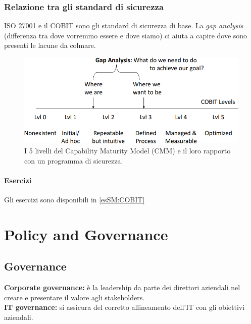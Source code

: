 \subsection{Relazione tra gli standard di sicurezza}

ISO 27001 e il COBIT sono gli standard di sicurezza di base. La \textit{gap
analysis} (differenza tra dove vorremmo essere e dove siamo) ci aiuta a capire
dove sono presenti le lacune da colmare.

\begin{figure}[h!]
        \begin{center}
                \includegraphics[scale=2.0]{res/img/security_standard}
        \end{center}
        \caption{I 5 livelli del Capability Maturity Model (CMM) e il
        loro rapporto con un programma di sicurezza.}
\end{figure}


\subsubsection{Esercizi}

Gli esercizi sono disponibili in \ref{esSM:COBIT}

\chapter{Policy and Governance}
\label{PG}

\section{Governance}

\textbf{Corporate governance:} è la leadership da parte dei direttori
aziendali nel creare e presentare il valore agli stakeholders.\\
\newline
\textbf{IT governance:} si assicura del corretto allineamento dell'IT con gli
obiettivi aziendali.




